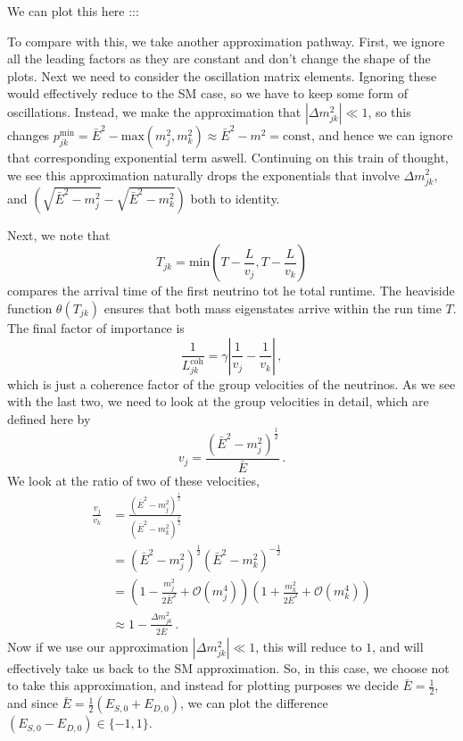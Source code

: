 \documentclass[10pt]{article}
\begin{document}
We can plot this here :::


To compare with this, we take another approximation pathway. First, we ignore all the leading factors as they are constant and don't change the shape of the plots. Next we need to consider the oscillation matrix elements. Ignoring these would effectively reduce to the SM case, so we have to keep some form of oscillations. Instead, we make the approximation that $|\Delta m_{jk}^{2}| \ll 1$, so this changes $p_{jk}^{\text{min}} = \bar{E}^{2} - \text{max}(m_{j}^{2},m_{k}^{2}) \approx \bar{E}^{2} - m^{2} = \text{const}$, and hence we can ignore that corresponding exponential term aswell. Continuing on this train of thought, we see this approximation naturally drops the exponentials that involve $\Delta m_{jk}^{2}$, and $\left(\sqrt{\bar{E}^{2} - m_{j}^{2}} - \sqrt{\bar{E}^{2} - m_{k}^{2}}\right)$ both to identity.

Next, we note that
\begin{equation}
  T_{jk} = \text{min}\left(T - \frac{L}{v_{j}}, T - \frac{L}{v_{k}}\right)
\end{equation}
compares the arrival time of the first neutrino tot he total runtime. The heaviside function $\theta(T_{jk})$ ensures that both mass eigenstates arrive within the run time $T$. The final factor of importance is
\begin{equation}
  \frac{1}{L_{jk}^{\text{coh}}} = \gamma\left |\frac{1}{v_{j}} - \frac{1}{v_{k}}\right|\, ,
\end{equation}
which is just a coherence factor of the group velocities of the neutrinos. As we see with the last two, we need to look at the group velocities in detail, which are defined here by
\begin{equation}
  v_{j} = \frac{\left(\bar{E}^{2} - m_{j}^{2}\right)^{\frac{1}{2}}}{\bar{E}}\, .
\end{equation}
We look at the ratio of two of these velocities,
\begin{equation}
  \begin{split}
    \frac{v_{j}}{v_{k}} & = \frac{\left(\bar{E}^{2} - m_{j}^{2}\right)^{\frac{1}{2}}}{\left(\bar{E}^{2} - m_{k}^{2}\right)^{\frac{1}{2}}} \\
    & = \left(\bar{E}^{2} - m_{j}^{2}\right)^{\frac{1}{2}}\left(\bar{E}^{2} - m_{k}^{2}\right)^{-\frac{1}{2}} \\
    & = \left(1 - \frac{m_{j}^{2}}{2\bar{E}^{2}} + \mathcal{O}(m_{j}^{4})\right)\left(1 + \frac{m_{k}^{2}}{2\bar{E}^{2}} + \mathcal{O}(m_{k}^{4})\right) \\
    & \approx 1 - \frac{\Delta m_{jk}^{2}}{2\bar{E}} \, .
  \end{split}
\end{equation}
Now if we use our approximation $|\Delta m_{jk}^{2}| \ll 1$, this will reduce to $1$, and will effectively take us back to the SM approximation. So, in this case, we choose not to take this approximation, and instead for plotting purposes we decide $\bar{E} = \frac{1}{2}$, and since $\bar{E} = \frac{1}{2}(E_{S,0} + E_{D,0})$, we can plot the difference $(E_{S,0} - E_{D,0})\in \{-1, 1\}$.
\end{document}
